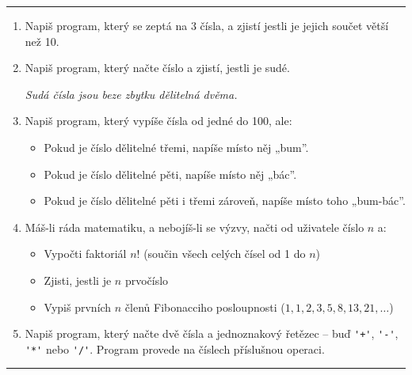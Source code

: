 \documentclass[a4paper,10pt]{article}
\begin{document}
\hrule

\begin{enumerate}[resume]

\item Napiš program, který se zeptá na 3 čísla,
    a zjistí jestli je jejich součet větší než 10.

\item Napiš program, který načte číslo a zjistí, jestli je sudé.

    \emph{\small Sudá čísla jsou beze \emph{zbytku} dělitelná dvěma.}

\item Napiš program, který vypíše čísla od jedné do 100, ale:
    \begin{itemize}
        \item Pokud je číslo dělitelné třemi, napíše místo něj „bum”.
        \item Pokud je číslo dělitelné pěti, napíše místo něj „bác”.
        \item Pokud je číslo dělitelné pěti i třemi zároveň, napíše místo toho „bum-bác”.
    \end{itemize}

\item Máš-li ráda matematiku, a nebojíš-li se výzvy, načti od uživatele číslo $n$ a:
    \begin{itemize}
        \item Vypočti faktoriál $n!$ (součin všech celých čísel od 1 do $n$)
        \item Zjisti, jestli je $n$ prvočíslo
        \item Vypiš prvních $n$ členů Fibonacciho posloupnosti ($1, 1, 2, 3, 5, 8, 13, 21, \ldots $)
    \end{itemize}

\item Napiš program, který načte dvě čísla a jednoznakový řetězec
    – buď \verb!'+'!, \verb!'-'!, \verb!'*'! nebo \verb!'/'!.
    Program provede na číslech příslušnou operaci.

\end{enumerate}

\hrule
\end{document}
